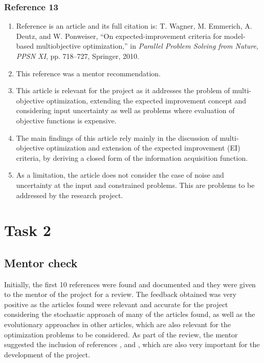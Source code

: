 \documentclass{journal}
\begin{document}
\subsubsection{Reference 13}
\begin{enumerate}
	\item Reference \cite{wagner2010expected} is an article and its full citation is: T. Wagner, M. Emmerich, A. Deutz, and W. Ponweiser, “On expected-improvement criteria for model-based multiobjective optimization,” in \textit{Parallel Problem Solving from Nature, PPSN XI}, pp. 718–727, Springer, 2010.
	\item This reference was a mentor recommendation.
	\item This article is relevant for the project as it addresses the problem of multi-objective optimization, extending the expected improvement concept and considering input uncertainty as well as problems where evaluation of objective functions is expensive.
	\item The main findings of this article rely mainly in the discussion of multi-objective optimization and extension of the expected improvement (EI) criteria, by deriving a closed form of the information acquisition function.
	\item As a limitation, the article does not consider the case of noise and uncertainty at the input and constrained problems. This are problems to be addressed by the research project.
\end{enumerate}

\section{Task 2}
\subsection{Mentor check}

Initially, the first 10 references were found and documented and they were given to the mentor of the project for a review. The feedback obtained was very positive as the articles found were relevant and accurate for the project considering the stochastic approach of many of the articles found, as well as the evolutionary approaches in other articles, which are also relevant for the optimization problems to be considered. As part of the review, the mentor suggested the inclusion of references \cite{Jones2001}, \cite{Jones1998} and \cite{wagner2010expected}, which are also very important for the development of the project.
\end{document}
